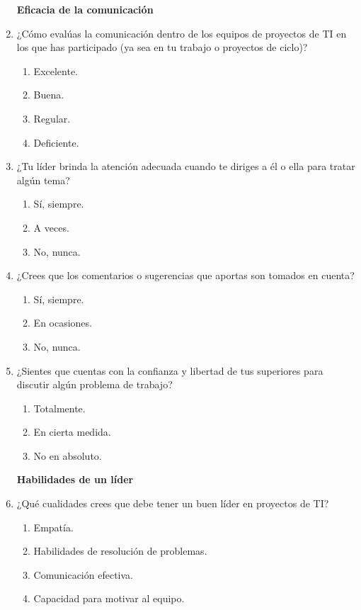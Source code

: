 \documentclass[journal]{IEEEtran}
\begin{document}
\begin{enumerate}
	\begin{center}
		\textbf{Eficacia de la comunicación}
	\end{center}
	
	\item ¿Cómo evalúas la comunicación dentro de los equipos de proyectos de TI en los que has participado (ya sea en tu trabajo o proyectos de ciclo)?
	\begin{enumerate}
		\item Excelente.
		\item Buena.
		\item Regular.
		\item Deficiente.
	\end{enumerate}
	
	\item ¿Tu líder brinda la atención adecuada cuando te diriges a él o ella para tratar algún tema?
	\begin{enumerate}
		\item Sí, siempre.
		\item A veces.
		\item No, nunca.
	\end{enumerate}
	
	\item ¿Crees que los comentarios o sugerencias que aportas son tomados en cuenta?
	\begin{enumerate}
		\item Sí, siempre.
		\item En ocasiones.
		\item No, nunca.
	\end{enumerate}
	
	\item ¿Sientes que cuentas con la confianza y libertad de tus superiores para discutir algún problema de trabajo?
	\begin{enumerate}
		\item Totalmente.
		\item En cierta medida.
		\item No en absoluto.
	\end{enumerate}
	
	\begin{center}
		\textbf{Habilidades de un líder}
	\end{center}
	
	\item ¿Qué cualidades crees que debe tener un buen líder en proyectos de TI?
	\begin{enumerate}
		\item Empatía.
		\item Habilidades de resolución de problemas.
		\item Comunicación efectiva.
		\item Capacidad para motivar al equipo.
	\end{enumerate}
	

\end{enumerate}
\end{document}
